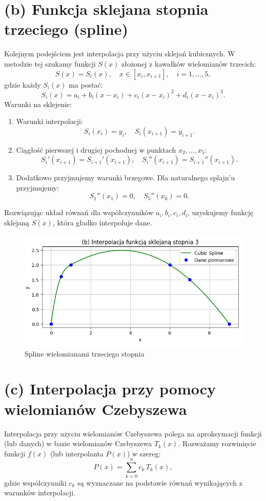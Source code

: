 \documentclass{article}
\begin{document}
\bigskip

\section*{(b) Funkcja sklejana stopnia trzeciego (spline)}
Kolejnym podejściem jest interpolacja przy użyciu sklejań kubicznych. \cite{wiki:Cubic_Spline,wiki:Spline_(mathematics)} W metodzie tej szukamy funkcji \( S(x) \) złożonej z kawałków wielomianów trzecich:
\[
S(x) = S_i(x),\quad x\in [x_i,x_{i+1}],\quad i=1,\ldots,5,
\]
gdzie każdy \( S_i(x) \) ma postać:
\[
S_i(x) = a_i + b_i (x-x_i) + c_i (x-x_i)^2 + d_i (x-x_i)^3.
\]
Warunki na sklejenie:
\begin{enumerate}
    \item Warunki interpolacji: 
    \[
    S_i(x_i) = y_i,\quad S_i(x_{i+1}) = y_{i+1}.
    \]
    \item Ciągłość pierwszej i drugiej pochodnej w punktach \( x_2, \ldots, x_5 \):
    \[
    S_i'(x_{i+1}) = S_{i+1}'(x_{i+1}),\quad S_i''(x_{i+1}) = S_{i+1}''(x_{i+1}).
    \]
    \item Dodatkowo przyjmujemy warunki brzegowe. Dla naturalnego splajn'u przyjmujemy:
    \[
    S_1''(x_1) = 0,\quad S_5''(x_6) = 0.
    \]
\end{enumerate}
Rozwiązując układ równań dla współczynników \( a_i, b_i, c_i, d_i \), uzyskujemy funkcję sklejaną \( S(x) \), która gładko interpoluje dane. \\

\begin{figure}[H]
    \centering
    \includegraphics[width=1\linewidth]{spline_3_stopnia.png}
    \caption{Spline wielomianami trzeciego stopnia}
    \label{fig:spline}
\end{figure}

\bigskip

\section*{(c) Interpolacja przy pomocy wielomianów Czebyszewa}
Interpolacja przy użyciu wielomianów Czebyszewa polega na aproksymacji funkcji (lub danych) w bazie wielomianów Czebyszewa \( T_k(x) \).  
Rozważamy rozwinięcie funkcji \( f(x) \) (lub interpolanta \( P(x) \)) w szereg:
\[
P(x) = \sum_{k=0}^{n} c_k \, T_k(x),
\]
gdzie współczynniki \( c_k \) są wyznaczane na podstawie równań wynikających z warunków interpolacji. \\[1mm]
\end{document}
